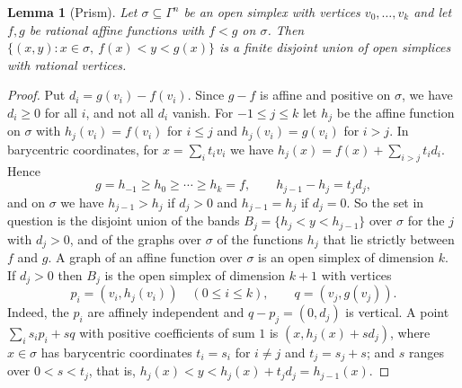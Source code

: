 \documentclass[12pt]{amsart}
\newtheorem{lem}{Lemma}
\theoremstyle{remark}
\begin{document}
\begin{lem}[Prism]\label{prism}
Let $\sigma \subseteq \Gamma^{n}$ be an open simplex with vertices $v_0, \ldots, v_k$ and let $f, g$ be rational affine functions with $f < g$ on $\sigma$. Then $\{(x, y) : x \in \sigma, \ f(x) < y < g(x)\}$ is a finite disjoint union of open simplices with rational vertices.
\end{lem}
\begin{proof}
Put $d_i = g(v_i) - f(v_i)$. Since $g - f$ is affine and positive on $\sigma$, we have $d_i \geq 0$ for all $i$, and not all $d_i$ vanish. For $-1 \leq j \leq k$ let $h_j$ be the affine function on $\sigma$ with $h_j(v_i) = f(v_i)$ for $i \leq j$ and $h_j(v_i) = g(v_i)$ for $i > j$. In barycentric coordinates, for $x = \sum_i t_i v_i$ we have $h_j(x) = f(x) + \sum_{i > j} t_i d_i$. Hence
\[
g = h_{-1} \geq h_0 \geq \cdots \geq h_k = f, \qquad h_{j-1} - h_j = t_j d_j ,
\]
and on $\sigma$ we have $h_{j-1} > h_j$ if $d_j > 0$ and $h_{j-1} = h_j$ if $d_j = 0$. So the set in question is the disjoint union of the bands $B_j = \{h_j < y < h_{j-1}\}$ over $\sigma$ for the $j$ with $d_j > 0$, and of the graphs over $\sigma$ of the functions $h_j$ that lie strictly between $f$ and $g$. A graph of an affine function over $\sigma$ is an open simplex of dimension $k$. If $d_j > 0$ then $B_j$ is the open simplex of dimension $k+1$ with vertices
\[
p_i = (v_i, h_j(v_i)) \quad (0 \leq i \leq k), \qquad q = (v_j, g(v_j)).
\]
Indeed, the $p_i$ are affinely independent and $q - p_j = (0, d_j)$ is vertical. A point $\sum_i s_i p_i + s q$ with positive coefficients of sum $1$ is $(x, h_j(x) + s d_j)$, where $x \in \sigma$ has barycentric coordinates $t_i = s_i$ for $i \neq j$ and $t_j = s_j + s$; and $s$ ranges over $0 < s < t_j$, that is, $h_j(x) < y < h_j(x) + t_j d_j = h_{j-1}(x)$.
\end{proof}
\end{document}

